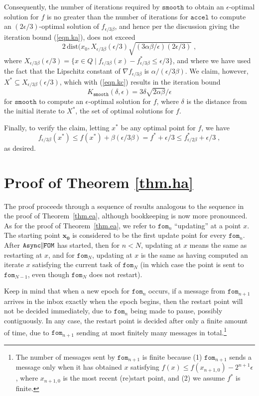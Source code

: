 \documentclass[reqno, 11pt]{amsart}
\numberwithin{equation}{section}
\newcommand{\nt}{\negthinspace}
\newcommand{\fom}{\mathtt{fom}}
\newcommand{\parfom}{\parallel \nt \nt  \mathtt{FOM}}
\newcommand{\accel}{\mathtt{accel}}
\newcommand{\smooth}{\mathtt{smooth}}
\newcommand{\aparfom}{\mathtt{Async} \nt \nt \parfom}
\newcommand{\grad}{\nabla}
\newcommand{\dist}{\mathrm{dist}}
\begin{document}
Consequently, the number of iterations required by $ \smooth $ to obtain an $ \epsilon $-optimal solution for $ f $ is no greater than the number of iterations for $ \accel $ to compute an $ (2\epsilon /3) $-optimal solution of $ f_{\epsilon/3 \beta} $, and hence per the discussion giving the iteration bound (\ref{eqn.ka}), does not exceed 
\begin{equation}  \label{eqn.kc} 
2 \, \dist(x_0, X_{\epsilon/3 \beta}( \epsilon/3 ) \sqrt{ (3 \alpha \beta/\epsilon)(2 \epsilon/ 3)}  \; , 
  \end{equation} 
where $ X_{\epsilon/3 \beta}(\epsilon/3) = \{ x \in Q \mid f_{\epsilon/3 \beta}(x) - f^*_{ \epsilon/3 \beta} \leq \epsilon/3 \} $, and where we have used the fact that the Lipschitz constant of $ \grad f_{\epsilon/3 \beta} $ is $ \alpha/ ( \epsilon /3 \beta) $. We claim, however,  $ X^* \subseteq X_{\epsilon/3 \beta}( \epsilon/3)  $, which with (\ref{eqn.kc})  results in the iteration bound
\[   K_{\smooth}(\delta, \epsilon) = 3   \delta \sqrt{2\alpha \beta} / \epsilon 
\] 
for $ \smooth $ to compute an $ \epsilon $-optimal solution for $ f $, where $ \delta $ is the distance from the initial iterate to $ X^* $, the set of optimal solutions for $ f $.

Finally, to verify the claim, letting $ x^* $ be any optimal point for $ f $, we have
\[  f_{\epsilon/3 \beta }(x^*) \leq f(x^*) + \beta (\epsilon/3 \beta) = f^* + \epsilon/3 \leq f_{\epsilon/2 \beta}^* + \epsilon/3 \; , \]
as desired. 

\section{{\bf  Proof of Theorem \ref{thm.ha} } } \label{sect.l}

The proof proceeds through a sequence of results analogous to the sequence in the proof of Theorem~\ref{thm.ea}, although bookkeeping is now  more pronounced. As for the proof of Theorem~\ref{thm.ea}, we refer to $ \fom_n $ ``updating'' at a point $ x $. The starting point $ \mathbf{x_0} $ is considered to be the first update point for every $ \fom_n $.  After $ \aparfom $ has started, then for $ n < N $, updating at $ x $ means the same as restarting at $ x $,  and for $ \fom_{N} $, updating at $ x $  is the same as having computed an iterate $ x $ satisfying the current task of $ \fom_{N} $ (in which case the point is sent to $ \fom_{N-1} $, even though $ \fom_{N} $ does not restart). 

Keep in mind that when a new epoch for $ \fom_n $ occurs, if a message from $ \fom_{n+1} $ arrives in the inbox exactly when the epoch begins, then the restart point will not be decided immediately, due to $ \fom_n $ being made to pause, possibly contiguously. In any case, the restart point is decided after only a finite amount of time, due to $ \fom_{n+1} $ sending at most finitely many messages in total.\footnote{The number of messages sent by $ \fom_{n+1} $ is finite because (1) $ \fom_{n+1} $ sends a message only when it has obtained $ x $ satisfying $ f(x) \leq f(x_{n+1,0}) - 2^{n+1} \epsilon $, where $ x_{n+1,0} $ is the most recent (re)start point, and (2) we assume $ f^* $ is finite.} 
\end{document}
